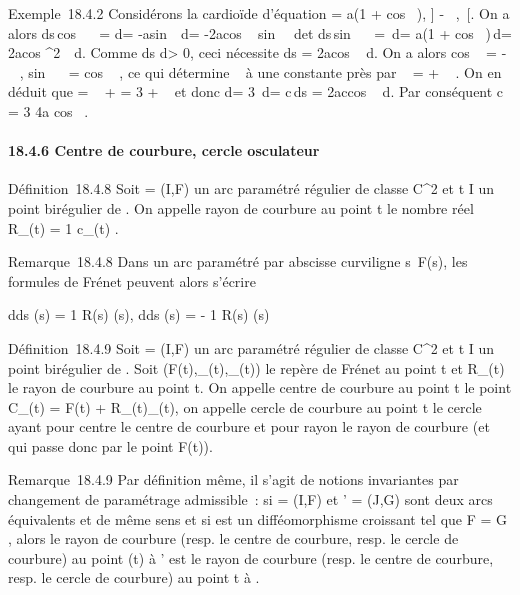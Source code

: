 \documentclass[]{article}
\begin{document}
Exemple~18.4.2 Considérons la cardioïde d'équation \rho = a(1
+ cos~ \theta), \theta \in] - \pi~,\pi~[. On a alors
ds\,cos~ \alpha~ = d\rho =
-asin~ \theta\,d\theta =
-2acos  \theta {}~
 sin  \theta {}~
\,d\theta et ds\,sin~
\alpha~ = \rho\,d\theta = a(1 + cos~
\theta)\,d\theta = 2acos ^2~
\theta {} \,d\theta. Comme  ds
\over d\theta > 0, ceci nécessite ds =
2acos  \theta {}~ d\theta. On a
alors cos \alpha~ = -\sin~
 \theta {} , sin~ \alpha~
= cos  \theta {}~ , ce qui
détermine \alpha~ à une constante près par \alpha~ = \theta {}
+ \pi~  . On en déduit que \phi = \alpha~ + \theta = 3\theta
{} + \pi~  et donc d\phi = 3
 \,d\theta = c\,ds =
2accos  \theta {}~ d\theta. Par
conséquent c = 3 \over 4a cos~
 \theta {}  .

\paragraph{18.4.6 Centre de courbure, cercle osculateur}

Définition~18.4.8 Soit \Gamma = (I,F) un arc paramétré régulier de classe
C^2 et t \in I un point birégulier de \Gamma. On appelle rayon de
courbure au point t le nombre réel R_\Gamma(t) = 1
\over c_\Gamma(t) .

Remarque~18.4.8 Dans un arc paramétré par abscisse curviligne
s\mapsto~F(s), les formules de Frénet peuvent alors
s'écrire

 d\vect \over ds (s) = 1
\over R(s) \vecn(s),
d\vecn \over ds (s) = - 1
\over R(s) \vect(s)

Définition~18.4.9 Soit \Gamma = (I,F) un arc paramétré régulier de classe
C^2 et t \in I un point birégulier de \Gamma. Soit
(F(t),\vect_\Gamma(t),\vecn_\Gamma(t))
le repère de Frénet au point t et R_\Gamma(t) le rayon de courbure
au point t. On appelle centre de courbure au point t le point
C_\Gamma(t) = F(t) +
R_\Gamma(t)\vecn_\Gamma(t), on appelle cercle
de courbure au point t le cercle ayant pour centre le centre de courbure
et pour rayon le rayon de courbure (et qui passe donc par le point
F(t)).

Remarque~18.4.9 Par définition même, il s'agit de notions invariantes
par changement de paramétrage admissible~: si \Gamma = (I,F) et \Gamma' = (J,G)
sont deux arcs équivalents et de même sens et si \theta est un
difféomorphisme croissant tel que F = G \cdot \theta, alors le rayon de courbure
(resp. le centre de courbure, resp. le cercle de courbure) au point \theta(t)
à \Gamma' est le rayon de courbure (resp. le centre de courbure, resp. le
cercle de courbure) au point t à \Gamma.
\end{document}
